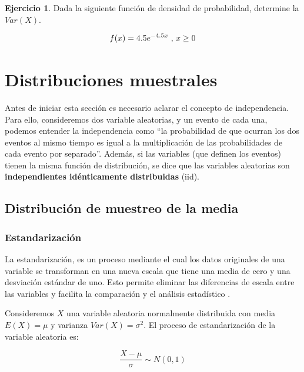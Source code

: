 \documentclass[
  11pt,
]{book}
\theoremstyle{definition}
\theoremstyle{definition}
\theoremstyle{definition}
\newtheorem{exercise}{Ejercicio}[chapter]
\theoremstyle{definition}
\theoremstyle{remark}
\begin{document}
\begin{exercise}

Dada la siguiente función de densidad de probabilidad, determine la \(Var(X)\).

\begin{equation}
\notag
f(x) = 4.5 e^{-4.5x} \text{ , } x \geq 0
\end{equation}

\end{exercise}

\chapter{Distribuciones muestrales}\label{distribucionesmuestrales}

Antes de iniciar esta sección es necesario aclarar el concepto de independencia. Para ello, consideremos dos variable aleatorias, y un evento de cada una, podemos entender la independencia como ``la probabilidad de que ocurran los dos eventos al mismo tiempo es igual a la multiplicación de las probabilidades de cada evento por separado''. Además, si las variables (que definen los eventos) tienen la misma función de distribución, se dice que las variables aleatorias son \textbf{independientes idénticamente distribuidas} (iid).

\section{Distribución de muestreo de la media}\label{distribucionesmuestrales-media}

\subsection{Estandarización}\label{distribucionesmuestrales-media-estandarizacion}

La estandarización, es un proceso mediante el cual los datos originales de una variable se transforman en una nueva escala que tiene una media de cero y una desviación estándar de uno. Esto permite eliminar las diferencias de escala entre las variables y facilita la comparación y el análisis estadístico \citep{hair2013multivariate}.

Consideremos \(X\) una variable aleatoria normalmente distribuida con media \(E(X) = \mu\) y varianza \(Var(X) = \sigma^2\). El proceso de estandarización de la variable aleatoria es:

\begin{equation}
\frac{X-\mu}{\sigma} \sim N(0,1)
\label{eq:estandarizacion}
\end{equation}
\end{document}
